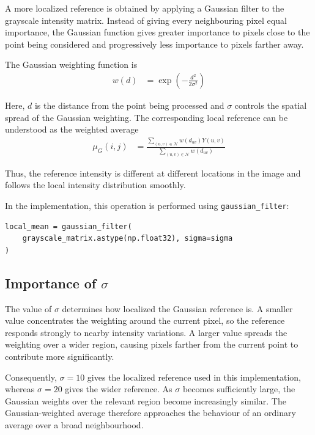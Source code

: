 A more localized reference is obtained by applying a Gaussian filter to
the grayscale intensity matrix. Instead of giving every neighbouring
pixel equal importance, the Gaussian function gives greater importance
to pixels close to the point being considered and progressively less
importance to pixels farther away.

The Gaussian weighting function is
\begin{align}
w(d)&=\exp\left(-\frac{d^2}{2\sigma^2}\right)\label{eq:gaussian_weight}
\end{align}

Here, $d$ is the distance from the point being processed and $\sigma$
controls the spatial spread of the Gaussian weighting. The corresponding
local reference can be understood as the weighted average
\begin{align}
\mu_G(i,j)&=
\frac{\displaystyle\sum_{(u,v)\in\mathcal{N}}
w(d_{uv})Y(u,v)}
{\displaystyle\sum_{(u,v)\in\mathcal{N}}w(d_{uv})}\label{eq:gaussian_local_mean}
\end{align}

Thus, the reference intensity is different at different locations in
the image and follows the local intensity distribution smoothly.

In the implementation, this operation is performed using
\texttt{gaussian\_filter}:
\newpage
\begin{lstlisting}[frame=single, basicstyle=\rmfamily]
local_mean = gaussian_filter(
    grayscale_matrix.astype(np.float32), sigma=sigma
)
\end{lstlisting}
\vspace*{\baselineskip}
\subsection{Importance of $\sigma$}

The value of $\sigma$ determines how localized the Gaussian reference
is. A smaller value concentrates the weighting around the current pixel,
so the reference responds strongly to nearby intensity variations. A
larger value spreads the weighting over a wider region, causing pixels
farther from the current point to contribute more significantly.

Consequently, $\sigma=10$ gives the localized reference used in this
implementation, whereas $\sigma=20$ gives the wider reference. As
$\sigma$ becomes sufficiently large, the Gaussian weights over the
relevant region become increasingly similar. The Gaussian-weighted
average therefore approaches the behaviour of an ordinary average over a
broad neighbourhood.
\vspace*{\baselineskip}
